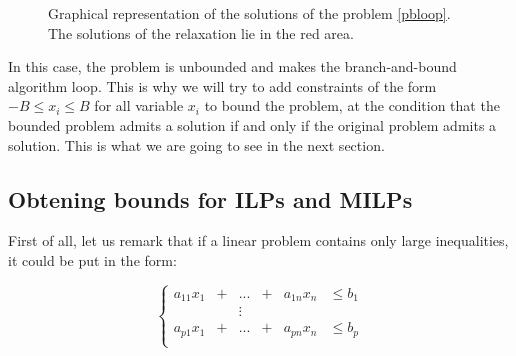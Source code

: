 \documentclass{article}
\begin{document}
\begin{figure}[h]
  \centering


  \label{bbloop}
  \caption{Graphical representation of the solutions of the problem
           \ref{pbloop}. The solutions of the relaxation lie in the red area.}
\end{figure}

In this case, the problem is unbounded and makes the branch-and-bound algorithm
loop. This is why we will try to add constraints of the form $-B \leqslant x_i
\leqslant B$ for all variable $x_i$ to bound the problem, at the condition that
the bounded problem admits a solution if and only if the original problem admits
a solution. This is what we are going to see in the next section.

\subsection{Obtening bounds for ILPs and MILPs}
\label{schrijverbnd}
First of all, let us remark that if a linear problem contains only large
inequalities, it could be put in the form:

\begin{displaymath}
  \left\{
  \begin{array}{cccccl}
    a_{11} x_1 & + & ...    & + & a_{1n} x_n & \leqslant b_1 \\
               &   & \vdots &   &            &               \\
    a_{p1} x_1 & + & ...    & + & a_{pn} x_n & \leqslant b_p \\
  \end{array}
  \right.
\end{displaymath}
\end{document}
